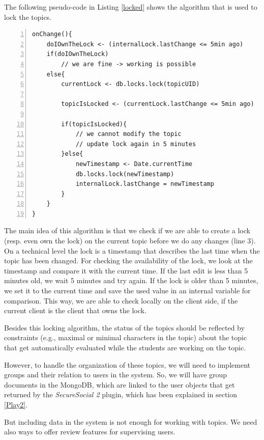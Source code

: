 The following pseudo-code in Listing \ref{locked} shows the algorithm that is used to lock the topics. 

\begin{lstlisting}[numbers=left,caption={Pseudocode of the locking algorithm that is used for preventing multi-user from overwriting content.},label=locked,frame=tlbr,breaklines]
onChange(){
	doIOwnTheLock <- (internalLock.lastChange <= 5min ago)
	if(doIOwnTheLock)
		// we are fine -> working is possible
	else{
		currentLock <- db.locks.lock(topicUID)
		
		topicIsLocked <- (currentLock.lastChange <= 5min ago)
		
		if(topicIsLocked){
			// we cannot modify the topic
			// update lock again in 5 minutes
		}else{
			newTimestamp <- Date.currentTime
			db.locks.lock(newTimestamp)
			internalLock.lastChange = newTimestamp
		}
	}
}
\end{lstlisting}

The main idea of this algorithm is that we check if we are able to create a lock (resp. even own the lock) on the current topic before we do any changes (line 3). On a technical level the lock is a timestamp that describes the last time when the topic has been changed. For checking the availability of the lock, we look at the timestamp and compare it with the current time. If the last edit is less than 5 minutes old, we wait 5 minutes and try again. 
If the lock is older than 5 minutes, we set it to the current time and save the used value in an internal variable for comparison. This way, we are able to check locally on the client side, if the current client is the client that owns the lock.

Besides this locking algorithm, the status of the topics should be reflected by constraints (e.g., maximal or minimal characters in the topic) about the topic that get automatically evaluated while the students are working on the topic. 

However, to handle the organization of these topics, we will need to implement groups and their relation to users in the system. So, we will have group documents in the MongoDB, which are linked to the user objects that get returned by the \emph{SecureSocial 2} plugin, which has been explained in section \ref{Play2}.

But including data in the system is not enough for working with topics. We need also ways to offer review features for supervising users. 

